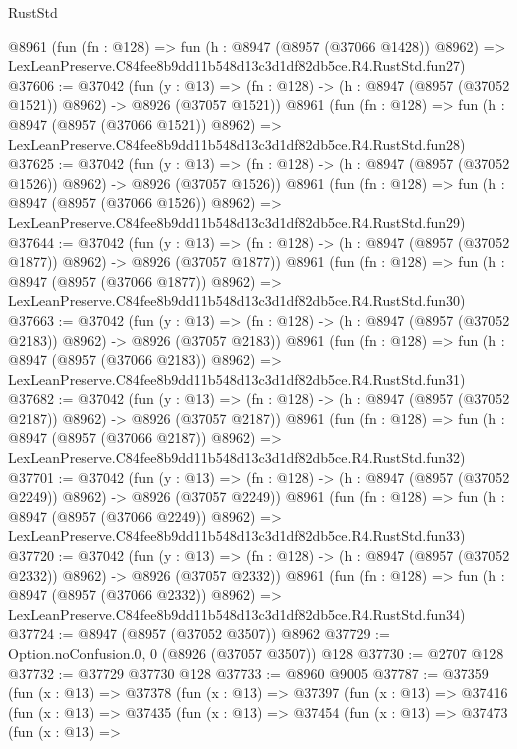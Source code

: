 \begin{lexlean}{RustStd}
\begin{coremodule}
    @8961
    (fun (fn : @128) =>
    fun (h : @8947 (@8957 (@37066 @1428)) @8962) =>
    LexLeanPreserve.C84fee8b9dd11b548d13c3d1df82db5ce.R4.RustStd.fun27)
@37606 := @37042
    (fun (y : @13) =>
    (fn : @128) -> (h : @8947 (@8957 (@37052 @1521)) @8962) -> @8926 (@37057 @1521))
    @8961
    (fun (fn : @128) =>
    fun (h : @8947 (@8957 (@37066 @1521)) @8962) =>
    LexLeanPreserve.C84fee8b9dd11b548d13c3d1df82db5ce.R4.RustStd.fun28)
@37625 := @37042
    (fun (y : @13) =>
    (fn : @128) -> (h : @8947 (@8957 (@37052 @1526)) @8962) -> @8926 (@37057 @1526))
    @8961
    (fun (fn : @128) =>
    fun (h : @8947 (@8957 (@37066 @1526)) @8962) =>
    LexLeanPreserve.C84fee8b9dd11b548d13c3d1df82db5ce.R4.RustStd.fun29)
@37644 := @37042
    (fun (y : @13) =>
    (fn : @128) -> (h : @8947 (@8957 (@37052 @1877)) @8962) -> @8926 (@37057 @1877))
    @8961
    (fun (fn : @128) =>
    fun (h : @8947 (@8957 (@37066 @1877)) @8962) =>
    LexLeanPreserve.C84fee8b9dd11b548d13c3d1df82db5ce.R4.RustStd.fun30)
@37663 := @37042
    (fun (y : @13) =>
    (fn : @128) -> (h : @8947 (@8957 (@37052 @2183)) @8962) -> @8926 (@37057 @2183))
    @8961
    (fun (fn : @128) =>
    fun (h : @8947 (@8957 (@37066 @2183)) @8962) =>
    LexLeanPreserve.C84fee8b9dd11b548d13c3d1df82db5ce.R4.RustStd.fun31)
@37682 := @37042
    (fun (y : @13) =>
    (fn : @128) -> (h : @8947 (@8957 (@37052 @2187)) @8962) -> @8926 (@37057 @2187))
    @8961
    (fun (fn : @128) =>
    fun (h : @8947 (@8957 (@37066 @2187)) @8962) =>
    LexLeanPreserve.C84fee8b9dd11b548d13c3d1df82db5ce.R4.RustStd.fun32)
@37701 := @37042
    (fun (y : @13) =>
    (fn : @128) -> (h : @8947 (@8957 (@37052 @2249)) @8962) -> @8926 (@37057 @2249))
    @8961
    (fun (fn : @128) =>
    fun (h : @8947 (@8957 (@37066 @2249)) @8962) =>
    LexLeanPreserve.C84fee8b9dd11b548d13c3d1df82db5ce.R4.RustStd.fun33)
@37720 := @37042
    (fun (y : @13) =>
    (fn : @128) -> (h : @8947 (@8957 (@37052 @2332)) @8962) -> @8926 (@37057 @2332))
    @8961
    (fun (fn : @128) =>
    fun (h : @8947 (@8957 (@37066 @2332)) @8962) =>
    LexLeanPreserve.C84fee8b9dd11b548d13c3d1df82db5ce.R4.RustStd.fun34)
@37724 := @8947 (@8957 (@37052 @3507)) @8962
@37729 := Option.noConfusion.{0, 0} (@8926 (@37057 @3507)) @128
@37730 := @2707 @128
@37732 := @37729 @37730 @128
@37733 := @8960 @9005
@37787 := @37359
    (fun (x : @13) =>
    @37378
      (fun (x : @13) =>
      @37397
        (fun (x : @13) =>
        @37416
          (fun (x : @13) =>
          @37435
            (fun (x : @13) =>
            @37454
              (fun (x : @13) =>
              @37473
                (fun (x : @13) =>

\end{coremodule}
\end{lexlean}

